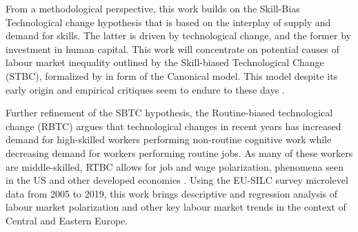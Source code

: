 \documentclass[11pt]{article}
\begin{document}



From a methodological perspective, this work builds on the Skill-Bias Technological change hypothesis \citep{katz1992changes} that is based on the interplay of supply and demand for skills. The latter is driven by technological change, and the former by investment in human capital. This work will concentrate on potential causes of labour market inequality outlined by the Skill-biased Technological Change (STBC), formalized by \cite{katz1992changes} in form of the Canonical model. This model despite its early origin \citep{katz1992changes} and empirical critiques seem to endure to these days \citep{aziz2021between, goldin2020extending}.

Further refinement of the SBTC hypothesis, the Routine-biased technological change (RBTC)  argues that technological changes in recent years has increased demand for high-skilled workers performing non-routine cognitive work while decreasing demand for workers performing routine jobs. As many of these workers are middle-skilled, RTBC allows for  job and wage polarization, phenomena seen in the US and other developed economies \citep{rodrik2020economic, temin2018vanishing}. Using the EU-SILC survey microlevel data from 2005 to 2019, this work brings descriptive and regression analysis of labour market polarization and other key labour market trends in the context of Central and Eastern Europe.


\end{document}

